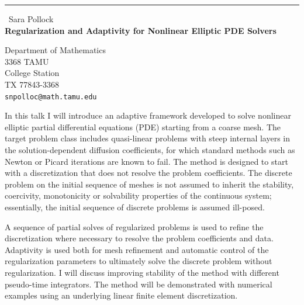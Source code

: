 \documentclass{report}
\begin{document}
\begin{center}
\rule{6in}{1pt} \
{\large Sara Pollock \\
{\bf Regularization and Adaptivity for Nonlinear Elliptic PDE Solvers}}

Department of Mathematics \\ 3368 TAMU \\ College Station \\ TX 77843-3368
\\
{\tt snpolloc@math.tamu.edu}\end{center}

In this talk I will introduce an adaptive framework developed to solve
nonlinear elliptic partial differential equations (PDE) starting from a
coarse mesh. The target problem class includes quasi-linear problems with
steep internal layers in the solution-dependent diffusion coefficients,
for which standard methods such as Newton or Picard iterations are known
to fail. The method is designed to start with a discretization that does
not resolve the problem coefficients. The discrete problem on the initial
sequence of meshes is not assumed to inherit the stability, coercivity,
monotonicity or solvability properties of the continuous system;
essentially, the initial sequence of discrete problems is assumed
ill-posed.

A sequence of partial solves of regularized problems is used to refine
the discretization where necessary to resolve the problem coefficients
and data. Adaptivity is used both for mesh refinement and automatic
control of the regularization parameters to ultimately solve the discrete
problem without regularization. I will discuss improving stability of the
method with different pseudo-time integrators. The method will be
demonstrated with numerical examples using an underlying linear finite
element discretization.
\end{document}
